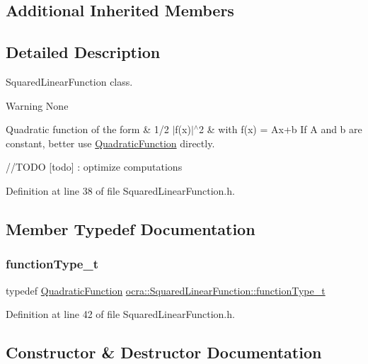 \subsection*{Additional Inherited Members}


\subsection{Detailed Description}
Squared\+Linear\+Function class. 

\begin{DoxyWarning}{Warning}
None
\end{DoxyWarning}
Quadratic function of the form \& 1/2 $|$f(x)$|$$^\wedge$2 \& with f(x) = Ax+b If A and b are constant, better use \hyperlink{classocra_1_1QuadraticFunction}{Quadratic\+Function} directly.

//\+T\+O\+DO \mbox{[}todo\mbox{]} \+: optimize computations 

Definition at line 38 of file Squared\+Linear\+Function.\+h.



\subsection{Member Typedef Documentation}
\hypertarget{classocra_1_1SquaredLinearFunction_a7f1e0d7cfae65a8111bf6615f8c24f19}{}\label{classocra_1_1SquaredLinearFunction_a7f1e0d7cfae65a8111bf6615f8c24f19} 
\subsubsection{\texorpdfstring{function\+Type\+\_\+t}{functionType\_t}}
{\footnotesize\ttfamily typedef \hyperlink{classocra_1_1QuadraticFunction}{Quadratic\+Function} \hyperlink{classocra_1_1SquaredLinearFunction_a7f1e0d7cfae65a8111bf6615f8c24f19}{ocra\+::\+Squared\+Linear\+Function\+::function\+Type\+\_\+t}}



Definition at line 42 of file Squared\+Linear\+Function.\+h.



\subsection{Constructor \& Destructor Documentation}
\hypertarget{classocra_1_1SquaredLinearFunction_ae0a8957e1371ef2681494298cd19c040}{}\label{classocra_1_1SquaredLinearFunction_ae0a8957e1371ef2681494298cd19c040} 

